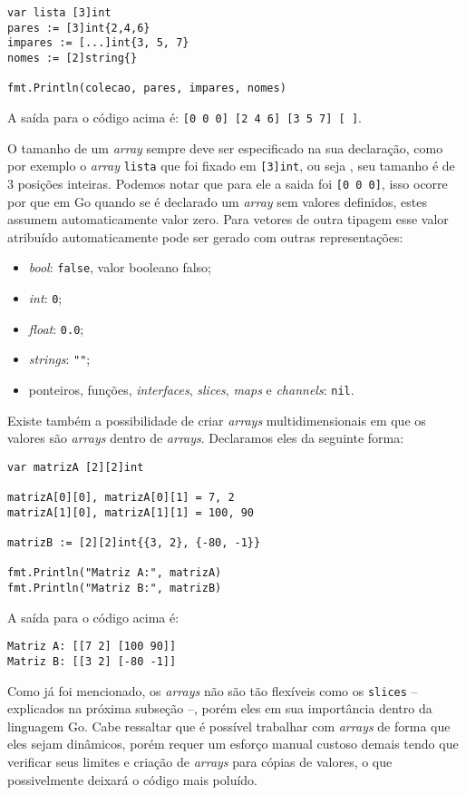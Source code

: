 \documentclass{SBCbookchapter}
\begin{document}
\begin{lstlisting}
var lista [3]int
pares := [3]int{2,4,6}
impares := [...]int{3, 5, 7}
nomes := [2]string{}

fmt.Println(colecao, pares, impares, nomes)
\end{lstlisting}

A saída para o código acima é: \texttt{[0 0 0] [2 4 6] [3 5 7] [ ]}.

O tamanho de um \textit{array} sempre deve ser especificado na sua declaração, como por exemplo o \textit{array} \texttt{lista} que foi fixado em \texttt{[3]int}, ou seja , seu tamanho é de 3 posições inteiras. Podemos notar que para ele a saida foi \texttt{[0 0 0]}, isso ocorre por que em Go quando se é declarado um \textit{array} sem valores definidos, estes assumem automaticamente valor zero. Para vetores de outra tipagem esse valor atribuído automaticamente pode ser gerado com outras representações:

\begin{itemize}
\item \textit{bool}: \texttt{false}, valor booleano falso;
\item \textit{int}: \texttt{0};
\item \textit{float}: \texttt{0.0};
\item \textit{strings}: \texttt{""};
\item ponteiros, funções, \textit{interfaces}, \textit{slices}, \textit{maps} e \textit{channels}: \texttt{nil}.
\end{itemize}


Existe também a possibilidade de criar \textit{arrays} multidimensionais em que os valores são \textit{arrays} dentro de \textit{arrays}. Declaramos eles da seguinte forma:


\begin{lstlisting}
var matrizA [2][2]int

matrizA[0][0], matrizA[0][1] = 7, 2
matrizA[1][0], matrizA[1][1] = 100, 90

matrizB := [2][2]int{{3, 2}, {-80, -1}}

fmt.Println("Matriz A:", matrizA)
fmt.Println("Matriz B:", matrizB)
\end{lstlisting}

A saída para o código acima é:

\noindent\texttt{Matriz A: [[7 2] [100 90]]}\\
\texttt{Matriz B: [[3 2] [-80 -1]]}

Como já foi mencionado, os \textit{arrays} não são tão flexíveis como os \texttt{slices} -- explicados na próxima subseção --, porém eles em sua importância dentro da linguagem Go. Cabe ressaltar que é possível trabalhar com \textit{arrays} de forma que eles sejam dinâmicos, porém requer um esforço manual custoso demais tendo que verificar seus limites e criação de \textit{arrays} para cópias de valores, o que possivelmente deixará o código mais poluído.
\end{document}
